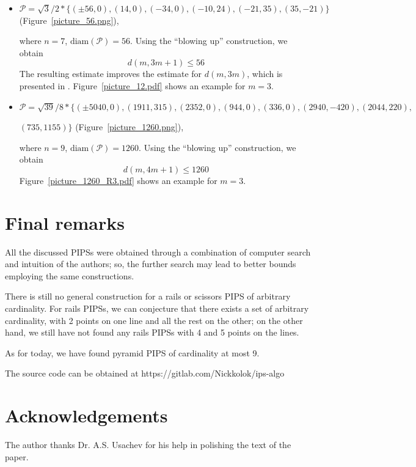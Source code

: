\documentclass[12pt]{article}
\theoremstyle{theorem}
\theoremstyle{dfn}
\theoremstyle{remark}
\begin{document}
\begin{itemize}
\setlength{\itemsep}{-1mm}


\item
$\mathcal{P}=\sqrt{3}/{2} * \{ (\pm 56, 0),
(14, 0),
(-34, 0),
(-10, 24),
(-21 , 35),
(35, -21)\}
$
(Figure~\ref{picture_56.png}),

where $n = 7$, $\operatorname{diam(\mathcal{P})} = 56$. Using the ``blowing up''
construction, we obtain
\begin{equation}\label{result2}
d(m, 3m + 1) \leq 56
\end{equation}
The resulting estimate improves the estimate for $d(m, 3m)$, which is presented
in \cite{kemnitz1988punktmengen}. Figure~\ref{picture_12.pdf} shows an example
for $m = 3$.


\item
$\mathcal{P}=\sqrt{39}/{8} * \{ (\pm 5040, 0),
(1911, 315),
(2352, 0),
(944, 0),
(336, 0),
(2940, -420),
(2044, 220),
$

$
(735, 1155)\}
$
(Figure~\ref{picture_1260.png}),

where $n = 9$, $\operatorname{diam(\mathcal{P})} = 1260$. Using the ``blowing up''
construction, we obtain
\begin{equation}\label{result3}
d(m, 4m + 1) \leq 1260
\end{equation}
Figure~\ref{picture_1260_R3.pdf} shows an example for $m = 3$.

\end{itemize}

\section{Final remarks}
All the discussed PIPSs were obtained through a combination of computer search and intuition of the authors;
so, the further search may lead to better bounds employing the same constructions.

There is still no general construction for a rails or scissors PIPS of arbitrary cardinality.
For rails PIPSs, we can conjecture that there exists a set of arbitrary cardinality, with 2 points on one line
and all the rest on the other;
on the other hand, we still have not found any rails PIPSs with 4 and 5 points on the lines.

As for today, we have found pyramid PIPS of cardinality at most 9.

The source code can be obtained at https://gitlab.com/Nickkolok/ips-algo

\section{Acknowledgements}
The author thanks Dr. A.S. Usachev for his help in polishing the text of the paper.

\printbibliography
%
\end{document}
